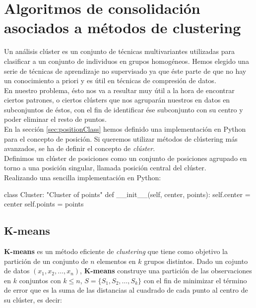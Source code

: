 \documentclass[a4paper, 12pt, spanish]{article}
\begin{document}
\pagebreak
\section{Algoritmos de consolidaci\'on asociados a m\'etodos de clustering}

Un an\'alisis cl\'uster es un conjunto de t\'ecnicas multivariantes utilizadas para clasificar a un conjunto de individuos en grupos homog\'eneos. Hemos elegido una serie de t\'ecnicas de aprendizaje no supervisado ya que \'este parte de que no hay un conocimiento a priori y es \'util en t\'ecnicas de compresi\'on de datos.\\

En nuestro problema, \'esto nos va a resultar muy \'util a la hora de encontrar ciertos patrones, o ciertos cl\'usters que nos agrupar\'an nuestros en datos en subconjuntos de \'estos, con el fin de identificar \'ese subconjunto con su centro y poder eliminar el resto de puntos. \\

En la secci\'on \ref{sec:positionClass} hemos definido una implementaci\'on en Python para el concepto de posici\'on. Si queremos utilizar m\'etodos de cl\'ustering m\'as avanzados, se ha de definir el concepto de \textit{cl\'uster}. \\

Definimos un cl\'uster de posiciones como un conjunto de posiciones agrupado en torno a una posici\'on singular, llamada posici\'on central del cl\'uster.\\

Realizando una sencilla implementaci\'on en Python:\\

\begin{python}
class Cluster:
	"Cluster of points"
	def __init__(self, center, points):
		self.center = center
		self.points = points
\end{python}

\pagebreak
\subsection{K-means}

\textbf{K-means}\cite{importantPlaces} es un m\'etodo eficiente de \textit{clustering} que tiene como objetivo la partici\'on de un conjunto de $n$ elementos en $k$ grupos distintos. Dado un cojunto de datos $(x_1, x_2, \ldots , x_n)$, \textbf{K-means} construye una partici\'on de las observaciones en $k$ conjuntos con $k\leq n$, $S=\{S_1, S_2, \ldots, S_k\}$ con el fin de minimizar el t\'ermino de error que es la suma de las distancias al cuadrado de cada punto al centro de su cl\'uster, es decir:\\
\end{document}
